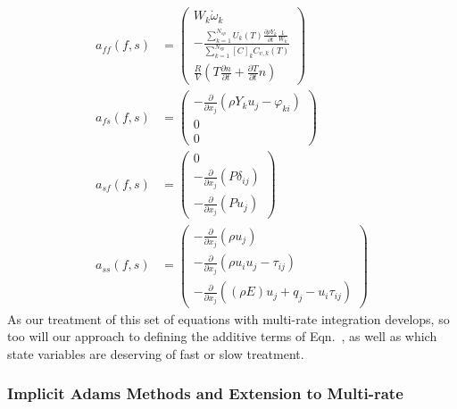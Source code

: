 \begin{align*}
a_{ff}(f,s) &= \left(\begin{array}{c} W_{k}\dot{\omega}_{k} \\[0.3cm]
	       - \frac{\sum_{k=1}^{N_{sp}}U_{k}(T)\frac{\partial \rho Y_{k}}{\partial t}\frac{1}{W_{k}}}{\sum_{k=1}^{N_{sp}}[C]_{k}C_{v,k}(T)} \\[0.5cm]
	       \frac{R}{V}(T\frac{\partial n}{\partial t} + \frac{\partial T}{\partial t}n) \end{array} \right) \\
a_{fs}(f,s) &= \left(\begin{array}{c} -\frac{\partial}{\partial x_{j}}(\rho Y_{k} u_{j} - \varphi_{ki}) \\
	                              0 \\
                                      0 \end{array} \right) \\
a_{sf}(f,s) &= \left(\begin{array}{c} 0 \\
                                      -\frac{\partial}{\partial x_{j}}(P\delta_{ij}) \\
                                      -\frac{\partial}{\partial x_{j}}(Pu_{j}) \end{array} \right) \\
a_{ss}(f,s) &= \left(\begin{array}{c} -\frac{\partial}{\partial x_{j}}(\rho u_{j}) \\
                                      -\frac{\partial}{\partial x_{j}}(\rho u_{i} u_{j} - \tau_{ij}) \\
                                      -\frac{\partial}{\partial x_{j}}((\rho E)u_{j} + q_{j} - u_{i}\tau_{ij}) \end{array} \right)
\end{align*}
As our treatment of this set of equations with multi-rate integration develops,
so too will our approach to defining the additive terms of Eqn.~,
as well as which state variables are deserving of fast or slow treatment.

\subsubsection{Implicit Adams Methods and Extension to Multi-rate}

